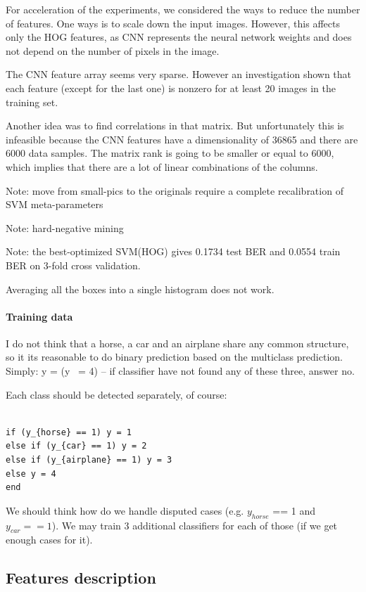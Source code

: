 \documentclass{article} %
\begin{document}
For acceleration of the experiments, we considered the ways to reduce the number of features. 
One ways is to scale down the input images. However, this affects only the HOG features, as CNN represents the neural network weights and does not depend on the number of pixels in the image.

The CNN feature array seems very sparse. However an investigation shown that each feature (except for the last one) is nonzero for at least 20 images in the training set.

Another idea was to find correlations in that matrix. But unfortunately this is infeasible because the CNN features have a dimensionality of 36865 and there are 6000 data samples. The matrix rank is going to be smaller or equal to 6000, which implies that there are a lot of linear combinations of the columns.


Note: move from small-pics to the originals require a complete recalibration of SVM meta-parameters

Note: hard-negative mining

Note: the best-optimized SVM(HOG) gives 0.1734 test BER and 0.0554 train BER on 3-fold cross validation.

Averaging all the boxes into a single histogram does not work.

\paragraph{Training data}

I do not think that a horse, a car and an airplane share any common structure, so it its reasonable to do binary prediction based on the multiclass prediction. Simply:
y = (y ~= 4)  -- if classifier have not found any of these three, answer no.

Each class should be detected separately, of course:

\begin{lstlisting}

if (y_{horse} == 1) y = 1
else if (y_{car} == 1) y = 2
else if (y_{airplane} == 1) y = 3
else y = 4
end
\end{lstlisting}

We should think how do we handle disputed cases (e.g. $y_{horse}$ == 1 and $y_{car} == 1$). We may train 3 additional classifiers for each of those (if we get enough cases for it).

\subsection{Features description}
\end{document}
